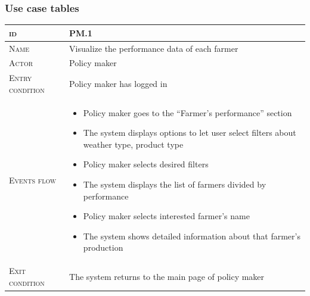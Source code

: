 \subsubsection*{Use case tables}

\begin{table}[H]
    \centering
    \begin{tabular}{|l|p{}|}
        \hline %
    	\textsc{id}                 &   PM.1\\
    	\hline %
    	\textsc{Name}               &   Visualize the performance data of each farmer\\
    	\hline %
    	\textsc{Actor}             &   Policy maker\\
    	\hline %
    	\textsc{Entry condition}   &   Policy maker has logged in\\
    	\hline %
    	\textsc{Events flow}         &   %
            	                        \begin{itemize}
                                    	    \item Policy maker goes to the “Farmer’s performance” section
                                    	    \item The system displays options to let user select filters about weather type, product type
                                    		\item Policy maker selects desired filters
                                    		\item The system displays the list of farmers divided by performance
                                    		\item Policy maker selects interested farmer’s name
                                    		\item The system shows detailed information about that farmer’s production
                                        \end{itemize}\\
        \hline %
        \textsc{Exit condition}    &  The system returns to the main page of policy maker\\

\end{tabular}
\end{table}
